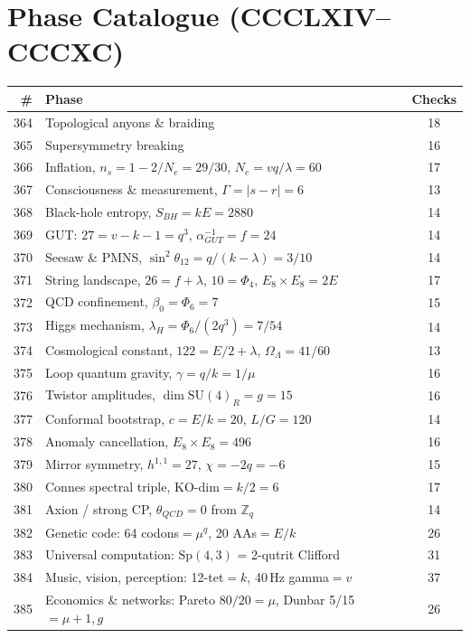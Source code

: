 \documentclass[11pt,a4paper]{article}
\begin{document}
\section{Phase Catalogue (CCCLXIV--CCCXC)}
\begin{longtable}{rlc}
\toprule
\# & Phase & Checks \\
\midrule
\endhead
364 & Topological anyons \& braiding & 18 \\
365 & Supersymmetry breaking & 16 \\
366 & Inflation, $n_s=1-2/N_e=29/30$, $N_e=vq/\lambda=60$ & 17 \\
367 & Consciousness \& measurement, $\Gamma=|s-r|=6$ & 13 \\
368 & Black-hole entropy, $S_{BH}=kE=2880$ & 14 \\
369 & GUT: $27=v-k-1=q^3$, $\alpha_{GUT}^{-1}=f=24$ & 14 \\
370 & Seesaw \& PMNS, $\sin^2\theta_{12}=q/(k-\lambda)=3/10$ & 14 \\
371 & String landscape, $26=f+\lambda$, $10=\Phi_4$, $E_8\!\times\!E_8=2E$ & 17 \\
372 & QCD confinement, $\beta_0=\Phi_6=7$ & 15 \\
373 & Higgs mechanism, $\lambda_H=\Phi_6/(2q^3)=7/54$ & 14 \\
374 & Cosmological constant, $122=E/2+\lambda$, $\Omega_\Lambda=41/60$ & 13 \\
375 & Loop quantum gravity, $\gamma=q/k=1/\mu$ & 16 \\
376 & Twistor amplitudes, $\dim\mathrm{SU}(4)_R=g=15$ & 16 \\
377 & Conformal bootstrap, $c=E/k=20$, $L/G=120$ & 14 \\
378 & Anomaly cancellation, $E_8\!\times\!E_8=496$ & 16 \\
379 & Mirror symmetry, $h^{1,1}=27$, $\chi=-2q=-6$ & 15 \\
380 & Connes spectral triple, $\mathrm{KO\text{-}dim}=k/2=6$ & 17 \\
381 & Axion / strong CP, $\theta_{QCD}=0$ from $\mathbb{Z}_q$ & 14 \\
382 & Genetic code: 64 codons$=\mu^q$, 20 AAs$=E/k$ & 26 \\
383 & Universal computation: $\mathrm{Sp}(4,3)$ = 2-qutrit Clifford & 31 \\
384 & Music, vision, perception: 12-tet$=k$, 40\,Hz gamma$=v$ & 37 \\
385 & Economics \& networks: Pareto $80/20=\mu$, Dunbar 5/15$=\mu{+}1, g$ & 26 \\

\end{longtable}
\end{document}
